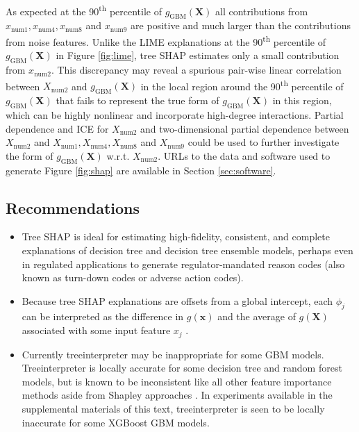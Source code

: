 \documentclass[sigconf, review]{acmart}
\begin{document}
As expected at the 90\textsuperscript{th} percentile of $g_{\text{GBM}}(\mathbf{X})$ all contributions from $x_{\text{num}1}, x_{\text{num}4}, x_{\text{num}8}$ and $x_{\text{num}9}$ are positive and much larger than the contributions from noise features. Unlike the LIME explanations at the 90\textsuperscript{th} percentile of $g_{\text{GBM}}(\mathbf{X})$ in Figure \ref{fig:lime}, tree SHAP estimates only a small contribution from $x_{\text{num}2}$. This discrepancy may reveal a spurious pair-wise linear correlation between $X_{\text{num}2}$ and $g_{\text{GBM}}(\mathbf{X})$ in the local region around the 90\textsuperscript{th} percentile of $g_{\text{GBM}}(\mathbf{X})$ that fails to represent the true form of $g_{\text{GBM}}(\mathbf{X})$ in this region, which can be highly nonlinear and incorporate high-degree interactions. Partial dependence and ICE for $X_{\text{num}2}$ and two-dimensional partial dependence between $X_{\text{num}2}$ and $X_{\text{num}1}, X_{\text{num}4}, X_{\text{num}8}$ and $X_{\text{num}9}$ could be used to further investigate the form of $g_{\text{GBM}}(\mathbf{X})$ w.r.t. $X_{\text{num}2}$. URLs to the data and software used to generate Figure \ref{fig:shap} are available in Section \ref{sec:software}.

\subsection{Recommendations}

\begin{itemize}
	
	\item Tree SHAP is ideal for estimating high-fidelity, consistent, and complete explanations of decision tree and decision tree ensemble models, perhaps even in regulated applications to generate regulator-mandated reason codes (also known as turn-down codes or adverse action codes).
	
	\item Because tree SHAP explanations are offsets from a global intercept, each $\phi_j$ can be interpreted as the difference in $g(\mathbf{x})$ and the average of $g(\mathbf{X})$ associated with some input feature $x_j$ \cite{molnar}. 
		
	\item Currently treeinterpreter may be inappropriate for some GBM models. Treeinterpreter is locally accurate for some decision tree and random forest models, but is known to be inconsistent like all other feature importance methods aside from Shapley approaches \cite{tree_shap}. In experiments available in the supplemental materials of this text, treeinterpreter is seen to be locally inaccurate for some XGBoost GBM models. 
	
\end{itemize}
\end{document}
